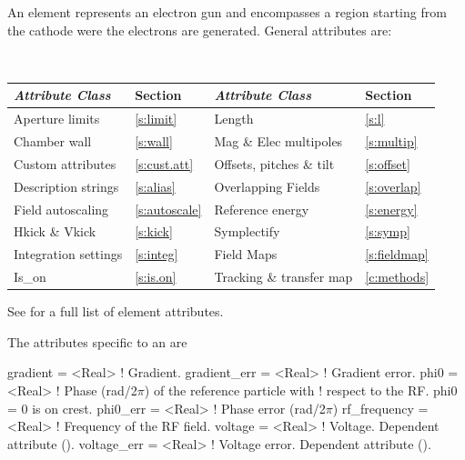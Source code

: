An  element represents an electron gun and encompasses a
region starting from the cathode were the electrons are generated.
General  attributes are:
\begin{center}
\tt
\begin{tabular}{llll} \toprule
  {\sl Attribute Class}      & Section           & {\sl Attribute Class}      & Section           \\ \midrule
  Aperture limits            & \ref{s:limit}     & Length                     & \ref{s:l}         \\
  Chamber wall               & \ref{s:wall}      & Mag \& Elec multipoles     & \ref{s:multip}    \\
  Custom attributes          & \ref{s:cust.att}  & Offsets, pitches \& tilt   & \ref{s:offset}    \\ 
  Description strings        & \ref{s:alias}     & Overlapping Fields         & \ref{s:overlap}   \\
  Field autoscaling          & \ref{s:autoscale} & Reference energy           & \ref{s:energy}    \\ 
  Hkick \& Vkick             & \ref{s:kick}      & Symplectify                & \ref{s:symp}      \\
  Integration settings       & \ref{s:integ}     & Field Maps                 & \ref{s:fieldmap}  \\
  Is_on                      & \ref{s:is.on}     & Tracking \& transfer map   & \ref{c:methods}   \\ 
  \bottomrule
\end{tabular}
\end{center}
\toffset
See  for a full list of element attributes.

The attributes specific to an  are 
\begin{example}
  gradient       = <Real>    ! Gradient.
  gradient_err   = <Real>    ! Gradient error.
  phi0           = <Real>    ! Phase (rad/2\(\pi\)) of the reference particle with 
                             !   respect to the RF. phi0 = 0 is on crest.
  phi0_err       = <Real>    ! Phase error (rad/2\(\pi\))
  rf_frequency   = <Real>    ! Frequency of the RF field.
  voltage        = <Real>    ! Voltage. Dependent attribute (). 
  voltage_err    = <Real>    ! Voltage error. Dependent attribute (). 
\end{example}

